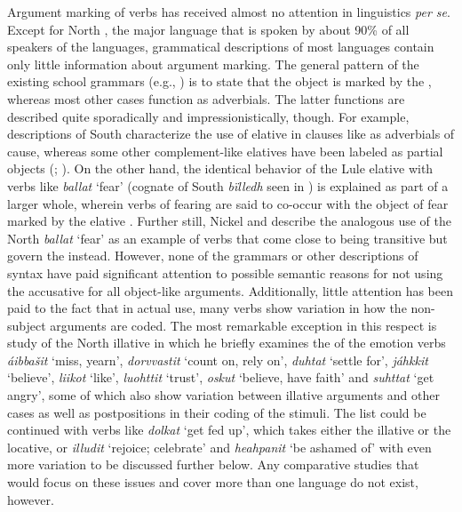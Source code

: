 \documentclass[output=paper]{LSP/langsci}
\begin{document}
 \newpage 
 Argument marking of  verbs has received almost no attention in  linguistics \textit{per se}. Except for North , the major  language that is spoken by about 90\% of all speakers of the  languages, grammatical descriptions of most  languages contain only little information about argument marking. The general pattern of the existing school grammars (e.g., \citealt{Spiik1989Lulesamisk,Olthuis2000Kielaoppa,Moshnikoffetal2009Koltansaamen,Maggaetal2012Sorsamisk}) is to state that the object is marked by the , whereas most other cases function as adverbials. The latter functions are described quite sporadically and impressionistically, though. For example, descriptions of South  characterize the use of elative in clauses like  as adverbials of cause, whereas some other complement-like elatives have been labeled as partial objects (\citealt[60–61, 72]{Bergsland1994Sydsamisk}; \citealt[186]{Maggaetal2012Sorsamisk}). On the other hand, the identical behavior of the Lule  elative with verbs like \textit{ballat} ‘fear’ (cognate of South  \textit{bïlledh} seen in ) is explained as part of a larger whole, wherein verbs of fearing are said to co-occur with the object of fear marked by the elative \citep[98]{Spiik1989Lulesamisk}. Further still, Nickel and \citet[233, 236, 529–530]{Nickeletal2011Nordsamisk} describe the analogous use of the North  \textit{ballat} ‘fear’ as an example of verbs that come close to being transitive but govern the  instead. However, none of the grammars or other descriptions of  syntax have paid significant attention to possible semantic reasons for not using the accusative for all object-like arguments. Additionally, little attention has been paid to the fact that in actual use, many verbs show variation in how the non-subject arguments are coded. The most remarkable exception in this respect is  study of the North  illative in which he briefly examines the  of the emotion verbs \textit{áibbašit} ‘miss, yearn’, \textit{dorvvastit} ‘count on, rely on’, \textit{duhtat} ‘settle for’, \textit{jáhkkit} ‘believe’, \textit{liikot} ‘like’, \textit{luohttit} ‘trust’, \textit{oskut} ‘believe, have faith’ and \textit{suhttat} ‘get angry’, some of which also show variation between illative arguments and other cases as well as postpositions in their coding of the stimuli. The list could be continued with verbs like \textit{dolkat} ‘get fed up’, which takes either the illative or the locative, or \textit{illudit} ‘rejoice; celebrate’ and \textit{heahpanit} ‘be ashamed of’ with even more variation to be discussed further below. Any comparative studies that would focus on these issues and cover more than one  language do not exist, however.
\end{document}
